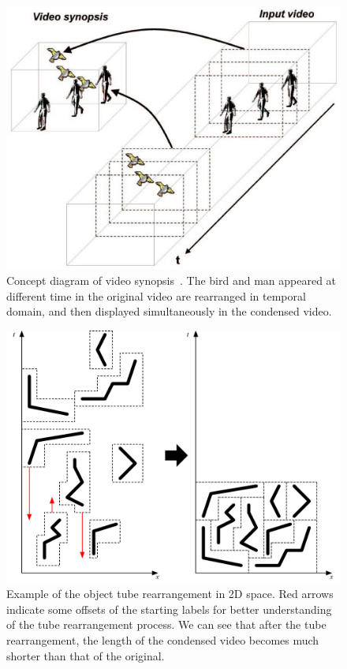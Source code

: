 \documentclass[11pt]{hyu_thesis}
\begin{document}
\begin{figure}
	\begin{center}
		\includegraphics[width=\linewidth]{video_synopsis.eps}
	\end{center}
	\caption{Concept diagram of video synopsis~\cite{Pritch2008}. The bird and man appeared at different time in the original video are rearranged in temporal domain, and then displayed simultaneously in the condensed video.}
	\label{fig:video_synopsis}
\end{figure}

\begin{figure}
	\begin{center}
		\includegraphics[width=\linewidth]{video_synopsis_2d.pdf}
	\end{center}
	\caption{Example of the object tube rearrangement in 2D space. Red arrows indicate some offsets of the starting labels for better understanding of the tube rearrangement process. We can see that after the tube rearrangement, the length of the condensed video becomes much shorter than that of the original.}
	\label{fig:video_synopsis_2d}
\end{figure}
\end{document}
